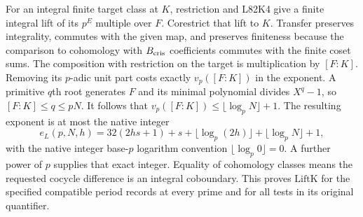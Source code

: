 For an integral finite target class at $K$, restriction and
L82K4 give a finite integral lift of its $p^E$ multiple over $F$.
Corestrict that lift to $K$. Transfer preserves integrality,
commutes with the given map, and preserves finiteness because
the comparison to cohomology with $B_{\rm cris}$ coefficients
commutes with the finite coset sums. The composition with
restriction on the target is multiplication by $[F:K]$.
Removing its $p$-adic unit part costs exactly $v_p([F:K])$
in the exponent. A primitive $q$th root generates $F$ and
its minimal polynomial divides $X^q-1$, so $[F:K]\le q\le pN$.
It follows that $v_p([F:K])\le\lfloor\log_p N\rfloor+1$.
The resulting exponent is at most the native integer
\[
  e_L(p,N,h)=32(2hs+1)
       +s+\lfloor\log_p(2h)\rfloor+\lfloor\log_p N\rfloor+1 ,
\]
with the native integer base-$p$ logarithm convention
$\lfloor\log_p0\rfloor=0$. A further power of $p$ supplies
that exact integer. Equality of cohomology classes means the
requested cocycle difference is an integral coboundary.
This proves $\mathrm{LiftK}$ for the specified compatible period
records at every prime and for all tests in its original quantifier.

